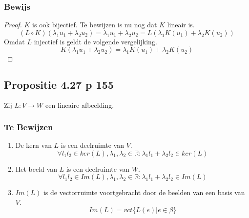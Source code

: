 \documentclass[lineaire_algebra_oplossingen.tex]{subfiles}
\begin{document}
\subsubsection*{Bewijs}
\begin{proof}
$K$ is ook bijectief. Te bewijzen is nu nog dat $K$ lineair is.
\[
(L\circ K)(\lambda_1u_1 + \lambda_2u_2) = \lambda_1u_1 + \lambda_2u_2 = L(\lambda_1K(u_1) + \lambda_2K(u_2))
\]
Omdat $L$ injectief is geldt de volgende vergelijking.
\[
K(\lambda_1u_1 + \lambda_2u_2) = \lambda_1K(u_1) + \lambda_2K(u_2)
\]
\end{proof}

\subsection{Propositie 4.27 p 155}
Zij $L: V\rightarrow W$ een lineaire afbeelding.
\subsubsection*{Te Bewijzen}
\begin{enumerate}
\item De kern van $L$ is een deelruimte van $V$.
\[
\forall l_1l_2\in ker(L), \lambda_1,\lambda_2\in \mathbb{R}: \lambda_1l_1+\lambda_2l_2 \in ker(L)
\]
\item Het beeld van $L$ is een deelruimte van $W$.
\[
\forall l_1l_2\in Im(L), \lambda_1,\lambda_2\in \mathbb{R}: \lambda_1l_1+\lambda_2l_2 \in Im(L)
\]
\item $Im(L)$ is de vectorruimte voortgebracht door de beelden van een basis van $V$.
\[
Im(L) = vct\{L(e)|e\in \beta\}
\]
\end{enumerate}
\end{document}
